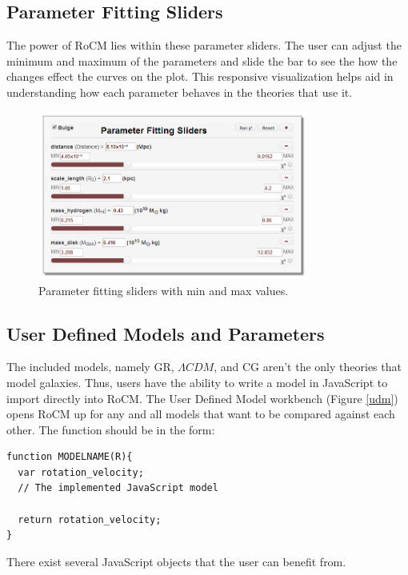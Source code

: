 \documentclass[conference]{IEEEtran}
\begin{document}
\subsection{Parameter Fitting Sliders}

The power of RoCM lies within these parameter sliders. The user can adjust the minimum and maximum of the parameters and slide the bar to see the how the changes effect the curves on the plot. This responsive visualization helps aid in understanding how each parameter behaves in the theories that use it.

\begin{figure}[h!]
\centering
\includegraphics[width=3.5in]{paramslider2}%
\caption{Parameter fitting sliders with min and max values.}
\label{slider_fig}
\end{figure}


\subsection{User Defined Models and Parameters}
The included models, namely GR, $\Lambda CDM$, and CG aren't the only theories that model galaxies. Thus, users have the ability to write a model in JavaScript to import directly into RoCM. The User Defined Model workbench (Figure \ref{udm}) opens RoCM up for any and all models that want to be compared against each other. The function should be in the form:
\begin{lstlisting}
function MODELNAME(R){
  var rotation_velocity;
  // The implemented JavaScript model
	
  return rotation_velocity; 
}
\end{lstlisting}


There exist several JavaScript objects that the user can benefit from. 
\end{document}
